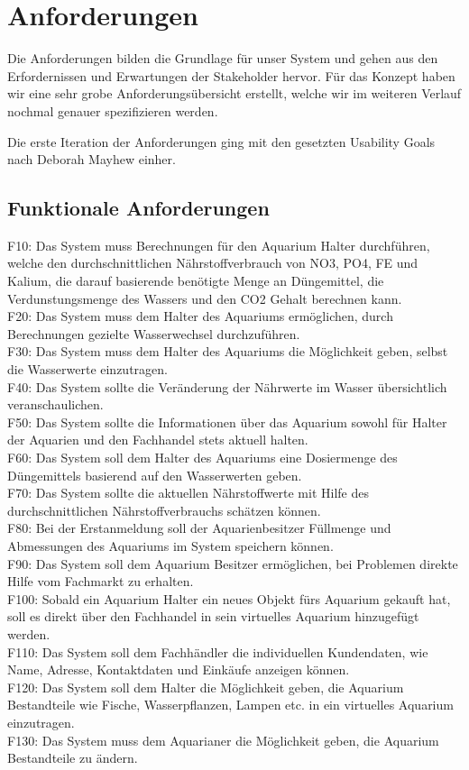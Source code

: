 \chapter{Anforderungen}
Die Anforderungen bilden die Grundlage für unser System und gehen aus den Erfordernissen und Erwartungen der Stakeholder hervor. Für das Konzept haben wir eine sehr grobe Anforderungsübersicht erstellt, welche wir im weiteren Verlauf nochmal genauer spezifizieren werden.

Die erste Iteration der Anforderungen ging mit den gesetzten Usability Goals nach Deborah Mayhew einher.

\section{Funktionale Anforderungen}

	F10: Das System muss Berechnungen für den Aquarium Halter durchführen, welche den durchschnittlichen Nährstoffverbrauch von NO3, PO4, FE und Kalium, die darauf basierende benötigte Menge an Düngemittel, die Verdunstungsmenge des Wassers und den CO2 Gehalt berechnen kann.\\
	F20: Das System muss dem Halter des Aquariums ermöglichen, durch Berechnungen gezielte Wasserwechsel durchzuführen.\\
	F30: Das System muss dem Halter des Aquariums die Möglichkeit geben, selbst die Wasserwerte einzutragen.\\
	F40: Das System sollte die Veränderung der Nährwerte im Wasser übersichtlich veranschaulichen.\\
	F50: Das System sollte die Informationen über das Aquarium sowohl für Halter der Aquarien und den Fachhandel stets aktuell halten.\\
	F60: Das System soll dem Halter des Aquariums eine Dosiermenge des Düngemittels basierend auf den Wasserwerten geben.\\
	F70: Das System sollte die aktuellen Nährstoffwerte mit Hilfe des durchschnittlichen Nährstoffverbrauchs schätzen können.\\
	F80: Bei der Erstanmeldung soll der Aquarienbesitzer Füllmenge und Abmessungen des Aquariums im System speichern können.\\
	F90: Das System soll dem Aquarium Besitzer ermöglichen, bei Problemen direkte Hilfe vom Fachmarkt zu erhalten.\\
	F100: Sobald ein Aquarium Halter ein neues Objekt fürs Aquarium gekauft hat, soll es direkt über den Fachhandel in sein virtuelles Aquarium hinzugefügt werden.\\
	F110: Das System soll dem Fachhändler die individuellen Kundendaten, wie Name, Adresse, Kontaktdaten und Einkäufe anzeigen können.\\
	F120: Das System soll dem Halter die Möglichkeit geben, die Aquarium Bestandteile wie Fische, Wasserpflanzen, Lampen etc.  in ein virtuelles Aquarium einzutragen.\\
	F130: Das System muss dem Aquarianer die Möglichkeit geben, die Aquarium Bestandteile zu ändern.

